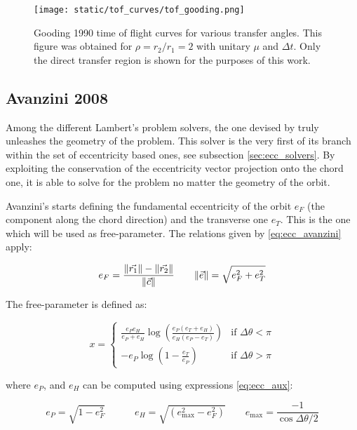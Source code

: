 \vspace{0.5cm}
\begin{figure}[h]
  \centering
  \texttt{[image: static/tof\_curves/tof\_gooding.png]}
  \caption{Gooding 1990 time of flight curves for various transfer angles. This
    figure was obtained for $\rho=r_2/r_1=2$ with unitary $\mu$ and $\Delta t$.
    Only the direct transfer region is shown for the purposes of this work.}
  \label{fig:tof_gooding}
\end{figure}


\subsection{Avanzini 2008}

Among the different Lambert's problem solvers, the one devised by
\cite{avanzini2008} truly unleashes the geometry of the problem. This solver is
the very first of its branch within the set of eccentricity based ones, see
subsection \ref{sec:ecc_solvers}. By exploiting the conservation of the
eccentricity vector projection onto the chord one, it is able to solve for the
problem no matter the geometry of the orbit.

Avanzini's starts defining the fundamental eccentricity of the orbit $e_F$ (the
component along the chord direction) and the transverse one $e_T$. This is the
one which will be used as free-parameter. The relations given by
\ref{eq:ecc_avanzini} apply:

\begin{equation}
  e_F = \frac{\lVert\vec{r_1}\rVert - \lVert\vec{r_2}\rVert}{\lVert\vec{c}\rVert}\quad\quad
  \lVert\vec{e}\rVert = \sqrt{e_F^2 + e_T^2}
  \label{eq:ecc_avanzini}
\end{equation}

The free-parameter is defined as:

\begin{equation}
  x =
  \begin{cases}
    \frac{e_P e_H}{e_P + e_H}\log{\left(\frac{e_P(e_T + e_H)}{e_H(e_P - e_T)}\right)} & \text{if $\Delta \theta < \pi$} \\
    -e_P \log{\left(1 - \frac{e_T}{e_P} \right)}                                      & \text{if $\Delta \theta > \pi$}
  \end{cases}
\end{equation}

where $e_P$, and $e_H$ can be computed using expressions \ref{eq:ecc_aux}:

\begin{equation}
  e_P = \sqrt{1 - e_F^2}\quad\quad\quad
  e_H = \sqrt{(e_\text{max}^2 - e_F^2)}\quad\quad
  e_\text{max} = \frac{-1}{\cos{\Delta \theta / 2}}
  \label{eq:ecc_aux}
\end{equation}

